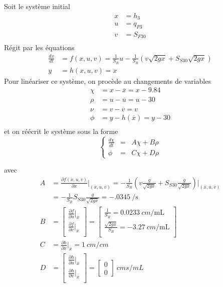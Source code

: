 \documentclass[frenchb, paper=a4, fontsize=11pt]{scrartcl}
\newcommand*\eq[1]{\overline{#1}} 				%
\numberwithin{equation}{section}					%
\numberwithin{figure}{section}					%
\numberwithin{table}{section}						%
\begin{document}
Soit le système initial
\begin{align}
x &= h_3 \\
u &= q_{P3}\\
v &= S_{F30}\\
\end{align}
Régit par les équations
\begin{align}
\frac{dx}{dt} &= f(x,u,v) = \frac{1}{S_R}u - \frac{1}{S_R}(v\sqrt{2gx} + S_{S30}\sqrt{2gx})\\
y &= h(x,u,v) = x
\end{align}
Pour linéariser ce système, on procède au changements de variables
\begin{align}
\chi &= x-\eq{x} = x - 9.84\\
\rho &= u-\eq{u} = u - 30\\
\nu &= v - \eq{v} = v\\
\phi &= y - h(\eq{x}) = y - 30\\
\end{align}
et on réécrit le système sous la forme
\begin{equation}
\left\{ \begin{array}{ccc}
\frac{d\chi}{dt} &=& A\chi + B\rho \\
\phi &=& C\chi + D\rho
\end{array}
\right.
\end{equation}

avec 
\begin{align}
A& = \frac{\partial f(x,u,v)}{\partial x}\rvert_{(\eq{x},\eq{u},\eq{v})} = -\frac{1}{S_R}(v\frac{g}{\sqrt{2gx}} + S_{S30}\frac{g}{\sqrt{2gx}})\rvert_{(\eq{x},\eq{u},\eq{v})} \\
&= -\frac{1}{S_R	} S_{S30} \frac{g}{\sqrt{2g\eq{x}}} = \SI{-.0345}{\per\second}\\
B &=\left[ \begin{array}{l}
 \frac{\partial f}{\partial u}\rvert_{\eq{x}} \\
  \frac{\partial f}{\partial v} \rvert_{\eq{x}}\\
\end{array} \right] 
= \left[ \begin{array}{l}
 \frac{1}{S_R} = \SI{0.0233}{cm\per \milli\liter}\\
  \frac{\sqrt{2g\eq{x}}}{S_R}= \SI{-3.27}{cm \per\milli\liter}\\
\end{array} \right] \\
C &= \frac{\partial h}{\partial x}\rvert_{\eq{x}} = \SI{1}{cm/cm}\\
D&=\left[ \begin{array}{l}
 \frac{\partial h}{\partial u}\rvert_{\eq{x}} \\
  \frac{\partial h}{\partial v} \rvert_{\eq{x}}\\
\end{array} \right]  = \left[ \begin{array}{l}
0\\
0
\end{array} \right] \SI{}{cm s \per mL}
\end{align}
\end{document}

